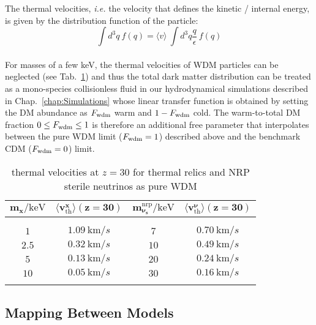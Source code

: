 The thermal velocities, \textit{i.e.} the velocity that defines the kinetic / internal energy, is given by the distribution function of the particle: \\
\begin{equation}
\int d^3q ~f(q) = \langle v \rangle ~\int d^3 q \frac{q}{\epsilon}~f(q)
\end{equation} \\ For masses of a few keV, the thermal velocities of WDM particles can be neglected (see Tab.~\ref{tab:vth}) and thus the total dark matter distribution can be treated as a mono-species collisionless fluid in our hydrodynamical simulations described in Chap.~\ref{chap:Simulations} whose linear transfer function is obtained by setting the DM abundance as $F_{\rm{wdm}}$ warm and $1-F_{\rm{wdm}}$ cold. The warm-to-total DM fraction $0 \leq F_{\rm{wdm}} \leq 1$ is therefore an additional free parameter that interpolates between the pure WDM limit ($F_{\rm{wdm}} = 1$) described above and the benchmark CDM ($F_{\rm{wdm}} = 0$) limit.


\begin{table}
	\begin{center}
	\begin{small}
		\begin{tabular}{cccc}
			$\pmb{m_x / \mathrm{keV}}$ & $\pmb{\langle v_{\mathrm{th}}^x \rangle (z=30)}$ & $\pmb{m_{\nu_s}^{\mathrm{nrp}} / \mathrm{keV}}$ & $\pmb{\langle v_{\mathrm{th}}^{\nu} \rangle (z=30)}$\\[2pt]
			\hline \\[-10pt]
			\\[-10pt]
			$1$ & $1.09~\mathrm{km}/s$ & $7$ & $0.70~\mathrm{km}/s$\\[2pt]
			$2.5$ & $0.32~\mathrm{km}/s$ & $10$ & $0.49~\mathrm{km}/s$\\[2pt]
			$5$ & $0.13~\mathrm{km}/s$ & $20$ & $0.24~\mathrm{km}/s$\\[2pt]
			$10$ & $0.05~\mathrm{km}/s$ & $30$ & $0.16~\mathrm{km}/s$\\[2pt]
			\hline \\[-10pt]
		\end{tabular}
	\end{small}
	\end{center}
	\caption{thermal velocities at $z=30$ for thermal relics and NRP sterile neutrinos as pure WDM}
	\label{tab:vth}
\end{table}


\subsection{Mapping Between Models}



